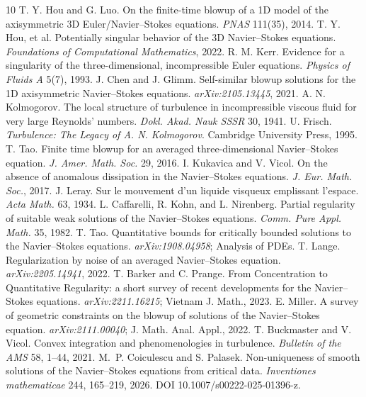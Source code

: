 \documentclass[11pt]{article}
\begin{document}

\begin{thebibliography}{10}
 T. Y. Hou and G. Luo. On the finite-time blowup of a 1D model of the axisymmetric 3D Euler/Navier--Stokes equations. \emph{PNAS} 111(35), 2014.
 T. Y. Hou, et al. Potentially singular behavior of the 3D Navier--Stokes equations. \emph{Foundations of Computational Mathematics}, 2022.
 R. M. Kerr. Evidence for a singularity of the three-dimensional, incompressible Euler equations. \emph{Physics of Fluids A} 5(7), 1993.
 J. Chen and J. Glimm. Self-similar blowup solutions for the 1D axisymmetric Navier--Stokes equations. \emph{arXiv:2105.13445}, 2021.
 A. N. Kolmogorov. The local structure of turbulence in incompressible viscous fluid for very large Reynolds' numbers. \emph{Dokl. Akad. Nauk SSSR} 30, 1941.
 U. Frisch. \emph{Turbulence: The Legacy of A. N. Kolmogorov}. Cambridge University Press, 1995.
 T. Tao. Finite time blowup for an averaged three-dimensional Navier--Stokes equation. \emph{J. Amer. Math. Soc.} 29, 2016.
 I. Kukavica and V. Vicol. On the absence of anomalous dissipation in the Navier--Stokes equations. \emph{J. Eur. Math. Soc.}, 2017.
 J. Leray. Sur le mouvement d'un liquide visqueux emplissant l'espace. \emph{Acta Math.} 63, 1934.
 L. Caffarelli, R. Kohn, and L. Nirenberg. Partial regularity of suitable weak solutions of the Navier--Stokes equations. \emph{Comm. Pure Appl. Math.} 35, 1982.
 T. Tao. Quantitative bounds for critically bounded solutions to the Navier--Stokes equations. \emph{arXiv:1908.04958}; Analysis of PDEs.
 T. Lange. Regularization by noise of an averaged Navier--Stokes equation. \emph{arXiv:2205.14941}, 2022.
 T. Barker and C. Prange. From Concentration to Quantitative Regularity: a short survey of recent developments for the Navier--Stokes equations. \emph{arXiv:2211.16215}; Vietnam J. Math., 2023.
 E. Miller. A survey of geometric constraints on the blowup of solutions of the Navier--Stokes equation. \emph{arXiv:2111.00040}; J. Math. Anal. Appl., 2022.
 T. Buckmaster and V. Vicol. Convex integration and phenomenologies in turbulence. \emph{Bulletin of the AMS} 58, 1--44, 2021.
 M.~P. Coiculescu and S. Palasek. Non-uniqueness of smooth solutions of the Navier--Stokes equations from critical data. \emph{Inventiones mathematicae} 244, 165--219, 2026. DOI 10.1007/s00222-025-01396-z.

\end{thebibliography}
\end{document}
